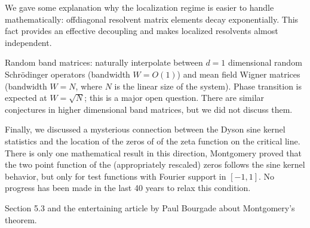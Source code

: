 \documentclass[letterpaper,10pt,english]{sphinxhowto}
\begin{document}
\sphinxAtStartPar
We gave some explanation why the localization regime is easier to handle mathematically: off\sphinxhyphen{}diagonal resolvent matrix elements decay exponentially. This fact provides an effective decoupling and makes localized resolvents almost independent.

\sphinxAtStartPar
Random band matrices: naturally interpolate between \(d=1\) dimensional random Schrödinger operators (bandwidth \(W=O(1)\)) and mean field Wigner matrices (bandwidth \(W = N\), where \(N\) is the linear size of the system). Phase transition is expected at \(W = \sqrt{N}\); this is a major open question. There are similar conjectures in higher dimensional band matrices, but we did not discuss them.

\sphinxAtStartPar
Finally, we discussed a mysterious connection between the Dyson sine kernel statistics and the location of the zeros of of the zeta function on the critical line. There is only one mathematical result in this direction, Montgomery proved that the two point function of the (appropriately rescaled) zeros follows the sine kernel behavior, but only for test functions with Fourier support in \([-1,1]\). No progress has been made in the last 40 years to relax this condition.

\sphinxAtStartPar
{}  Section 5.3 and the entertaining article  by Paul Bourgade about Montgomery’s theorem.
\end{document}
